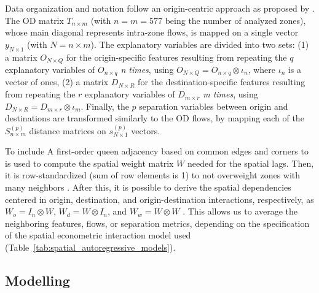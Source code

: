 Data organization and notation follow an origin-centric approach as proposed by \citep{LeSage2008SpatialFlows}. The OD matrix  $T_{n \times m}$ (with $n = m= 577$ being the number of analyzed zones), whose main diagonal represents intra-zone flows, is mapped on a single vector $y_{N \times 1}$ (with $N = n \times m$). The explanatory variables are divided into two sets: (1) a matrix $O_{N \times Q}$ for the origin-specific features resulting from repeating the $q$ explanatory variables of $O_{n \times q}$ \emph{n times}, using $O_{N \times Q} = O_{n \times q} \otimes \iota_n$, where $\iota_n$ is a vector of ones, (2) a matrix $D_{N \times R}$ for the destination-specific features resulting from repeating the $r$ explanatory variables of $D_{m \times r}$ \emph{m times}, using $D_{N \times R} = D_{m \times r} \otimes \iota_m$. Finally, the $p$ separation variables between origin and destinations are transformed similarly to the OD flows, by mapping each of the $S_{n \times m}^{(p)}$ distance matrices on $s_{N \times 1}^{(p)}$ vectors.%

To include A first-order queen adjacency based on common edges and corners to is used to compute the spatial weight matrix $W$ needed for the spatial lags. Then, it is row-standardized (sum of row elements is 1) to not overweight zones with many neighbors \citep{Griffith2020SomeModels}.
After this, it is possible to derive the spatial dependencies centered in origin, destination, and origin-destination interactions, respectively, as $W_o = I_n \otimes W$,  $W_d = W \otimes I_n$, and $W_w = W \otimes W$ \citep{LeSage2008SpatialFlows}. This allows us to average the neighboring features, flows, or separation metrics, depending on the specification of the spatial econometric interaction model used (Table~\ref{tab:spatial_autoregressive_models}).

\subsection{Modelling}
\label{subsec:ETRCO2H_modelling}

